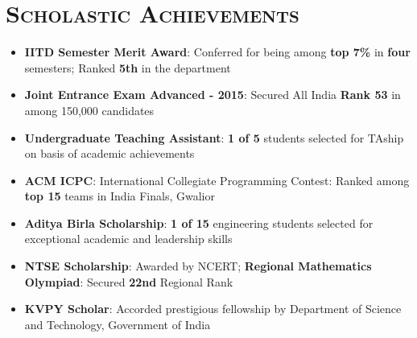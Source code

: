 \documentclass{article}
\newcommand{\tmpsection}[1]{}
\let\tmpsection=\section
\renewcommand{\section}[1]{\tmpsection*{\textsc{#1}}}
\begin{document}
\section{Scholastic Achievements}
\begin{itemize}
    \setlength\itemsep{0.0em}
 \item \textbf{IITD Semester Merit Award}: Conferred for being among \textbf{top 7\%} in \textbf{four} semesters; Ranked \textbf{5th} in the department                                                                                                   \item \textbf{Joint Entrance Exam Advanced - 2015}: Secured All India \textbf{Rank 53} in  among 150,000 candidates
\item\textbf{Undergraduate Teaching Assistant}: \textbf{1 of 5} students selected for TAship on basis of academic achievements                                                                                                                                      \item \textbf{ACM ICPC}: International Collegiate Programming Contest: Ranked among \textbf{top 15} teams in India Finals, Gwalior
 \item \textbf{Aditya Birla Scholarship}: \textbf{1 of 15} engineering students selected for exceptional academic and leadership skills                                                                                                                             \item \textbf{NTSE Scholarship}: Awarded by NCERT; \textbf{Regional Mathematics Olympiad}: Secured \textbf{22nd} Regional Rank                                                                                                                          \item \textbf{KVPY Scholar}: Accorded prestigious fellowship by Department of Science and Technology, Government of India
\end{itemize}
\end{document}
